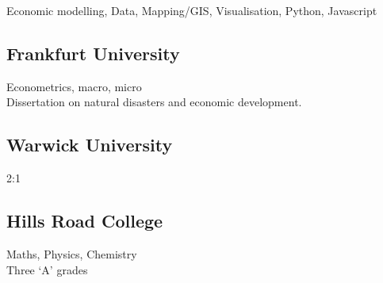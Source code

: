 \documentclass[a4paper,nomath]{deedy-resume} %
\begin{document}
\begin{minipage}[t]{0.3\textwidth}
    Economic modelling, Data, Mapping/GIS, Visualisation, Python, Javascript
    \sectionspace

    \subsection{Frankfurt University}

    Econometrics, macro, micro\\
    Dissertation on natural disasters and economic development.
    \sectionspace %

    \subsection{Warwick University}
    2:1
    \sectionspace %


    \subsection{Hills Road College}
    Maths, Physics, Chemistry \\
    Three `A' grades
    \sectionspace %


\end{minipage} %








\end{document}

